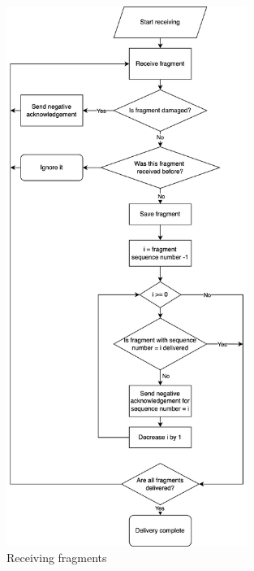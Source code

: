 \documentclass{article}
\begin{document}
\begin{figure}[!h]
    \centering
    \includegraphics[width=0.7\textwidth]{images/receiving.png}
    \caption{Receiving fragments}
    \label{fig:mesh2}
\end{figure}
\end{document}
